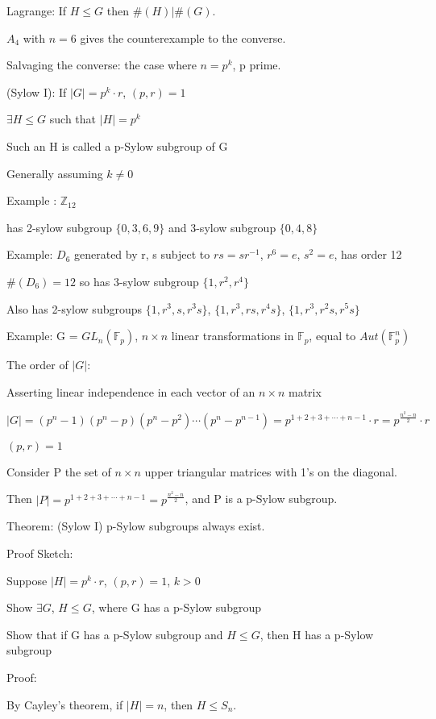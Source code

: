 \documentclass[12pt]{article}
\begin{document}
Lagrange: If $H \leq G$ then $\#(H)|\#(G)$.

$A_4$ with $n = 6$ gives the counterexample to the converse.

\noindent
Salvaging the converse: the case where $n = p^k$, p prime.

\noindent
(Sylow I): If $|G| = p^k \cdot r$, $(p, r) = 1$

$\exists H \leq G$ such that $|H| = p^k$

Such an H is called a p-Sylow subgroup of G

Generally assuming $k \neq 0$

\noindent
Example : $\mathds{Z}_{12}$

has 2-sylow subgroup $\{0, 3, 6, 9\}$ and 3-sylow subgroup $\{0, 4, 8\}$

\noindent
Example: $D_6$ generated by r, s subject to $rs = sr^{-1}$, $r^6 = e$, $s^2 = e$, has order 12

$\#(D_6) = 12$ so has 3-sylow subgroup $\{1, r^2, r^4\}$

Also has 2-sylow subgroups $\{1, r^3, s, r^3s\}$, $\{1, r^3, rs, r^4s\}$, $\{1, r^3, r^2s, r^5s\}$

\noindent
Example: G = $GL_n(\mathds{F}_p)$, $n \times n$ linear transformations in $\mathds{F}_p$, equal to $Aut(\mathds{F}_p^n)$

\noindent
The order of $|G|$:  

Asserting linear independence in each vector of an $n \times n$ matrix

$|G| = (p^n - 1)(p^n-p)(p^n-p^2)\cdots(p^n-p^{n-1}) = p^{1 + 2 + 3 + \cdots + n - 1}\cdot r = p^{\frac{n^2 - n}{2}} \cdot r$

$(p, r) = 1$

Consider P the set of $n \times n$ upper triangular matrices with 1's on the diagonal.

Then $|P| = p^{1 + 2 + 3 + \cdots + n - 1} = p^{\frac{n^2 - n}{2}}$, and P is a p-Sylow subgroup.

\noindent
Theorem: (Sylow I) p-Sylow subgroups always exist.

\noindent
Proof Sketch:

Suppose $|H| = p^k \cdot r$, $(p, r) = 1$, $k > 0$

Show $\exists G$, $H \leq G$, where G has a p-Sylow subgroup

Show that if G has a p-Sylow subgroup and $H \leq G$, then H has a p-Sylow subgroup

\noindent
Proof:

By Cayley's theorem, if $|H| = n$, then $H \leq S_n$.
\end{document}

